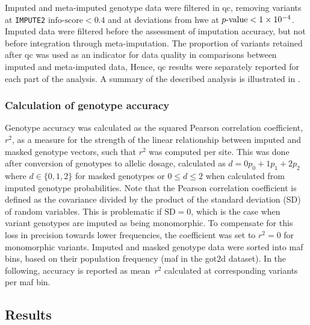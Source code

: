 %

%

Imputed and meta-imputed genotype data were filtered in \gls{qc}, removing variants at \texttt{IMPUTE2} ${\mbox{info-score}<0.4}$ and at deviations from \gls{hwe} at ${\mbox{$p$-value}<\num{1e-4}}$.
Imputed data were filtered before the assessment of imputation accuracy, but not before integration through meta-imputation.
The proportion of variants retained after \gls{qc} was used as an indicator for data quality in comparisons between imputed and meta-imputed data, 
Hence, \gls{qc} results were separately reported for each part of the analysis.
A summary of the described analysis is illustrated in .



\subsubsection{Calculation of genotype accuracy}

Genotype accuracy was calculated as the squared Pearson correlation coefficient, $r^2$, as a measure for the strength of the linear relationship between imputed and masked genotype vectors, such that $r^2$ was computed per site.
This was done after conversion of genotypes to allelic dosage, calculated as ${d=0p_{0}+1p_{1}+2p_{2}}$ where ${d \in \lbrace 0,1,2 \rbrace}$ for masked genotypes or ${0 \leq d \leq 2}$ when calculated from imputed genotype probabilities.
Note that the Pearson correlation coefficient is defined as the covariance divided by the product of the standard deviation (SD) of  random variables.
This is problematic if $\text{SD}=0$, which is the case when variant genotypes are imputed as being monomorphic.
To compensate for this loss in precision towards lower frequencies, the coefficient was set to ${r^2=0}$ for monomorphic variants.
Imputed and masked genotype data were sorted into \gls{maf} bins, based on their population frequency (\gls{maf} in the \gls{got2d} dataset).
In the following, accuracy is reported as mean~$r^2$ calculated at corresponding variants per \gls{maf} bin.


%
\subsection{Results}
\label{metaimpute_accuracy_results}
%

